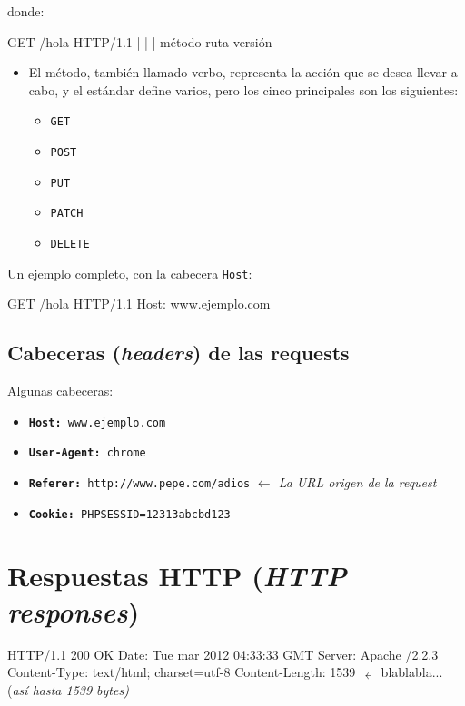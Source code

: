 \documentclass[a4paper,11pt]{memoir}
\begin{document}
donde:

\begin{codigo}
GET     /hola   HTTP/1.1
|       |       |
método  ruta    versión
\end{codigo}

\begin{itemize}
    \item El método, también llamado verbo, representa la acción que se desea
    llevar a cabo, y el estándar define varios, pero los cinco principales
    son los siguientes:

    \begin{itemize}
        \item \texttt{GET}
        \item \texttt{POST}
        \item \texttt{PUT}
        \item \texttt{PATCH}
        \item \texttt{DELETE}
    \end{itemize}
\end{itemize}

Un ejemplo completo, con la cabecera \texttt{Host}:
\begin{codigo}
GET /hola HTTP/1.1
Host: www.ejemplo.com
\end{codigo}

\subsection{Cabeceras (\emph{headers}) de las requests}

Algunas cabeceras:
\begin{itemize}
    \item \texttt{\textbf{Host:}}\texttt{ www.ejemplo.com}
    \item \texttt{\textbf{User-Agent:}}\texttt{ chrome}
    \item \texttt{\textbf{Referer:}}\texttt{ http://www.pepe.com/adios} \emph{$\leftarrow$
        La URL origen de la request}
    \item \texttt{\textbf{Cookie:}}\texttt{ PHPSESSID=12313abcbd123}
\end{itemize}

\section{Respuestas HTTP (\emph{HTTP responses})}

\begin{codigo}
HTTP/1.1 200 OK
Date: Tue mar 2012 04:33:33 GMT
Server: Apache /2.2.3
Content-Type: text/html; charset=utf-8
Content-Length: 1539
\(\dlsh\)
blablabla...                (\emph{así hasta 1539 bytes)}
\end{codigo}
\end{document}
